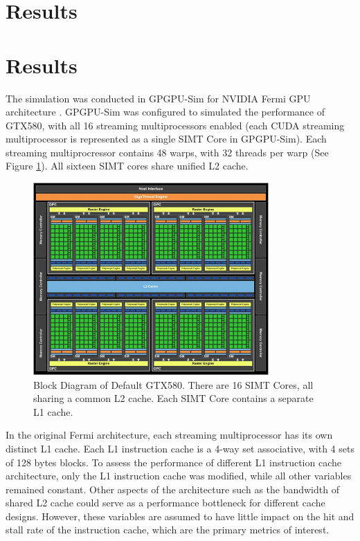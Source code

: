 \section{Results}
\section{Results}

The simulation was conducted in GPGPU-Sim for NVIDIA Fermi GPU architecture \cite{bakhodayuan09}. GPGPU-Sim was configured to simulated the performance of GTX580, with all 16 streaming multiprocessors enabled (each CUDA streaming multiprocessor is represented as a single SIMT Core in GPGPU-Sim). Each streaming multiprocressor contains 48 warps, with 32 threads per warp (See Figure \ref{GTX580}). All sixteen SIMT cores share unified L2 cache.

\begin{figure}[ht!]
\centering
\includegraphics[width=90mm]{GTX580.jpg}
\caption{Block Diagram of Default GTX580. There are 16 SIMT Cores, all sharing a common L2 cache. Each SIMT Core contains a separate L1 cache.}
\label{GTX580}
\end{figure}

In the original Fermi architecture, each streaming multiprocessor has its own distinct L1 cache. Each L1 instruction cache is a 4-way set associative, with 4 sets of 128 bytes blocks. To assess the  performance of different L1 instruction cache architecture, only the L1 instruction cache was modified, while all other variables remained constant. Other aspects of the architecture such as the bandwidth of shared L2 cache could serve as a performance bottleneck for different cache designs. However, these variables are assumed to have little impact on the hit and stall rate of the instruction cache, which are the primary metrics of interest.

